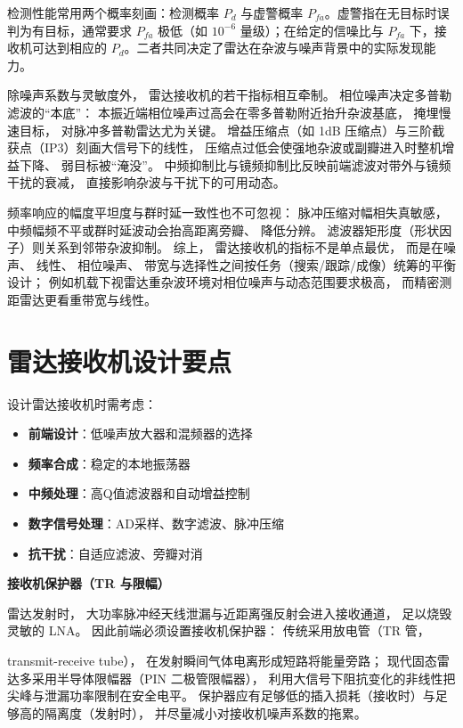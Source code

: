 检测性能常用两个概率刻画：检测概率 $P_d$ 与虚警概率 $P_{fa}$。虚警指在无目标时误判为有目标，通常要求 $P_{fa}$ 极低（如 $10^{-6}$ 量级）；在给定的信噪比与 $P_{fa}$ 下，接收机可达到相应的 $P_d$。二者共同决定了雷达在杂波与噪声背景中的实际发现能力。

除噪声系数与灵敏度外，
雷达接收机的若干指标相互牵制。
相位噪声决定多普勒滤波的“本底”：
本振近端相位噪声过高会在零多普勒附近抬升杂波基底，
掩埋慢速目标，
对脉冲多普勒雷达尤为关键。
增益压缩点（如 1dB 压缩点）与三阶截获点（IP3）刻画大信号下的线性，
压缩点过低会使强地杂波或副瓣进入时整机增益下降、
弱目标被“淹没”。
中频抑制比与镜频抑制比反映前端滤波对带外与镜频干扰的衰减，
直接影响杂波与干扰下的可用动态。

频率响应的幅度平坦度与群时延一致性也不可忽视：
脉冲压缩对幅相失真敏感，
中频幅频不平或群时延波动会抬高距离旁瓣、
降低分辨。
滤波器矩形度（形状因子）则关系到邻带杂波抑制。
综上，
雷达接收机的指标不是单点最优，
而是在噪声、
线性、
相位噪声、
带宽与选择性之间按任务（搜索/跟踪/成像）统筹的平衡设计；
例如机载下视雷达重杂波环境对相位噪声与动态范围要求极高，
而精密测距雷达更看重带宽与线性。

\section{雷达接收机设计要点}
\label{sec:radar_design}

设计雷达接收机时需考虑：

\begin{itemize}
    \item \textbf{前端设计}：低噪声放大器和混频器的选择
    \item \textbf{频率合成}：稳定的本地振荡器
    \item \textbf{中频处理}：高Q值滤波器和自动增益控制
    \item \textbf{数字信号处理}：AD采样、数字滤波、脉冲压缩
    \item \textbf{抗干扰}：自适应滤波、旁瓣对消
\end{itemize}

\medskip\noindent\textbf{接收机保护器（TR 与限幅）}

雷达发射时，
大功率脉冲经天线泄漏与近距离强反射会进入接收通道，
足以烧毁灵敏的 LNA。
因此前端必须设置接收机保护器：
传统采用放电管（TR 管，
 
transmit-receive tube），
在发射瞬间气体电离形成短路将能量旁路；
现代固态雷达多采用半导体限幅器（PIN 二极管限幅器），
利用大信号下阻抗变化的非线性把尖峰与泄漏功率限制在安全电平。
保护器应有足够低的插入损耗（接收时）与足够高的隔离度（发射时），
并尽量减小对接收机噪声系数的拖累。

